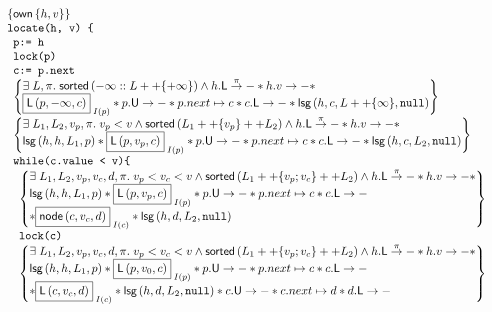 \[
\begin{array}{l}
	\left\{\ownSet{h}{v} \right\}\\
	\command{locate(h, v) \{}\\
	\begin{array}{l}
		\command{p:= h}\\
		\command{lock(p)}\\
		\command{c:= p.next}\\
		
		\left\{
		\begin{array}{@{} l @{}}
			\exsts{L, \pi} \sorted{-\infty :: L ++ \{+\infty\}} \land  \lockT{h}[\pi] * \valueT{h}{v} * \\
			 \shared{\lockedNode{p}{-\infty}{c}}{I(p)} * \unlockT{p} * \cell{p.next}{c} * \lockT{c} * \lsg{h}{c}{L++\{\infty\}}{\nil}
		\end{array}	 
		\right\}\\
		
		
		\left\{
		\begin{array}{@{} l @{}}
			\exsts{L_1, L_2, v_p, \pi} v_p < v \land \sorted{L_1 ++\{v_p\}  ++ L_2}  \land \lockT{h}[\pi] * \valueT{h}{v} * \\
			\lsg{h}{h}{L_1}{p} * \shared{\lockedNode{p}{v_p}{c}}{I(p)} * \unlockT{p} * \cell{p.next}{c} * \lockT{c} * \lsg{h}{c}{L_2}{\nil}
		\end{array}
		\right\}\\
		
		\command{while(c.value < v)\{}\\
			\begin{array}{l}
				\left\{
				\begin{array}{@{} l @{}}
					\exsts{L_1, L_2, v_p, v_c, d, \pi} v_p < v_c < v \land  \sorted{L_1 ++ \{v_p; v_c\} ++L_2}  \land \lockT{h}[\pi] * \valueT{h}{v} * \\
					\lsg{h}{h}{L_1}{p} * 
				 	\shared{\lockedNode{p}{v_p}{c}}{I(p)} * \unlockT{p} * \cell{p.next}{c} * \lockT{c}\\ 
				 	* \shared{\node{c}{v_c}{d}}{I(c)} * \lsg{h}{d}{L_2}{\nil}
				 	
			 	\end{array}
			 	\right\}\\
			 	
			 	
			 	\command{lock(c)}\\
			 	
			 	\left\{
				\begin{array}{@{} l @{}}
			 		\exsts{L_1, L_2, v_p, v_c, d, \pi} v_p < v_c < v \land \sorted{L_1 ++ \{v_p; v_c\} ++L_2}  \land \lockT{h}[\pi] * \valueT{h}{v} * \\
					\lsg{h}{h}{L_1}{p} * 
			 		\shared{\lockedNode{p}{v_0}{c}}{I(p)} * \unlockT{p} * \cell{p.next}{c} * \lockT{c}\\ 
			 		* \shared{\lockedNode{c}{v_c}{d}}{I(c)} * \lsg{h}{d}{L_2}{\nil}
			 		* \unlockT{c} * \cell{c.next}{d} * \lockT{d}
			 	\end{array}
			 	\right\}\\
			 	

\end{array}
\end{array}
\end{array}\]
